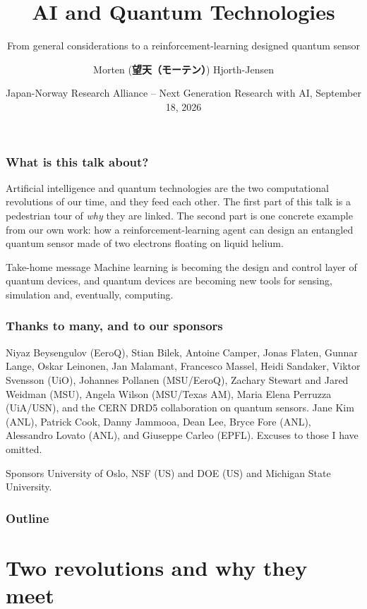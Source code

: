 \documentclass{beamer}
\title[AI and Quantum Technologies]{\textbf{AI and Quantum Technologies}}
\subtitle{From general considerations to a reinforcement-learning designed quantum sensor}
\author{Morten (\textbf{望天（モーテン）}) Hjorth-Jensen}
\institute[University of Oslo]{Department of Physics and Center for Computing in Science Education, University of Oslo, Norway}
\date{Japan-Norway Research Alliance – Next Generation Research with AI, September 18, 2026}
\begin{document}
\begin{frame}
\titlepage
\end{frame}

\begin{frame}
\frametitle{What is this talk about?}
\begin{block}{}
Artificial intelligence and quantum technologies are the two computational revolutions of our time, and they feed each other. The first part of this talk is a pedestrian tour of \emph{why} they are linked. The second part is one concrete example from our own work: how a reinforcement-learning agent can design an entangled quantum sensor made of two electrons floating on liquid helium.
\end{block}
\vspace{3mm}
\begin{block}{Take-home message}
Machine learning is becoming the design and control layer of quantum devices, and quantum devices are becoming new tools for sensing, simulation and, eventually, computing.
\end{block}
\end{frame}

\begin{frame}
\frametitle{Thanks to many, and to our sponsors}
{\small
Niyaz Beysengulov (EeroQ), Stian Bilek, Antoine Camper, Jonas Flaten, Gunnar Lange, Oskar Leinonen, Jan Malamant, Francesco Massel, Heidi Sandaker, Viktor Svensson (UiO), Johannes Pollanen (MSU/EeroQ), Zachary Stewart and Jared Weidman (MSU), Angela Wilson (MSU/Texas AM), Maria Elena Perruzza (UiA/USN),  and the CERN DRD5 collaboration on quantum sensors.
Jane Kim (ANL), Patrick Cook, Danny Jammooa, Dean Lee, Bryce Fore (ANL), Alessandro Lovato (ANL), and Giuseppe Carleo (EPFL). Excuses to those I have omitted.
}
\vspace{2mm}
\begin{block}{Sponsors}
University of Oslo, NSF (US) and DOE (US) and Michigan State University.
\end{block}
\end{frame}

\begin{frame}
\frametitle{Outline}
\tableofcontents
\end{frame}

\section{Two revolutions and why they meet}
\end{document}
